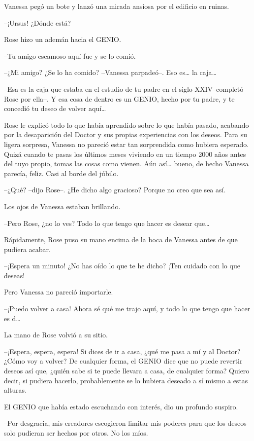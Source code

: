 Vanessa pegó un bote y lanzó una mirada ansiosa por el edificio en
ruinas.

--¡Ursus! ¿Dónde está?

Rose hizo un ademán hacia el GENIO.

--Tu amigo escamoso aquí fue y se lo comió.

--¿Mi amigo? ¿Se lo ha comido? --Vanessa parpadeó--. Eso es\ldots{} la
caja\ldots{}

--Esa es la caja que estaba en el estudio de tu padre en el siglo
XXIV--completó Rose por ella--. Y esa cosa de dentro es un GENIO, hecho
por tu padre, y te concedió tu deseo de volver aquí\ldots{}

Rose le explicó todo lo que había aprendido sobre lo que había pasado,
acabando por la desaparición del Doctor y sus propias experiencias con
los deseos. Para su ligera sorpresa, Vanessa no pareció estar tan
sorprendida como hubiera esperado. Quizá cuando te pasas los últimos
meses viviendo en un tiempo 2000 años antes del tuyo propio, tomas las
cosas como vienen. Aún así\ldots{} bueno, de hecho Vanessa parecía,
feliz. Casi al borde del júbilo.

--¿Qué? --dijo Rose--. ¿He dicho algo gracioso? Porque no creo que sea
así.

Los ojos de Vanessa estaban brillando.

--Pero Rose, ¿no lo ves? Todo lo que tengo que hacer es desear
que\ldots{}

Rápidamente, Rose puso su mano encima de la boca de Vanessa antes de que
pudiera acabar.

--¡Espera un minuto! ¿No has oído lo que te he dicho? ¡Ten cuidado con
lo que deseas!

Pero Vanessa no pareció importarle.

--¡Puedo volver a casa! Ahora sé qué me trajo aquí, y todo lo que tengo
que hacer es d\ldots{}

La mano de Rose volvió a su sitio.

--¡Espera, espera, espera! Si dices de ir a casa, ¿qué me pasa a mí y al
Doctor? ¿Cómo voy a volver? De cualquier forma, el GENIO dice que no
puede revertir deseos así que, ¿quién sabe si te puede llevara a casa,
de cualquier forma? Quiero decir, si pudiera hacerlo, probablemente se
lo hubiera deseado a sí mismo a estas alturas.

El GENIO que había estado escuchando con interés, dio un profundo
suspiro.

--Por desgracia, mis creadores escogieron limitar mis poderes para que
los deseos solo pudieran ser hechos por otros. No los míos.

